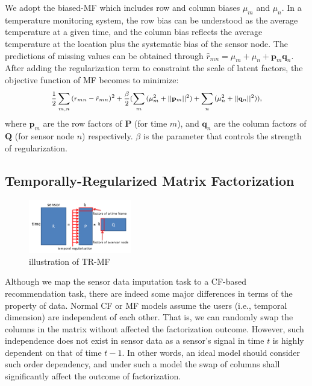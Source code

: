 We adopt the biased-MF which includes row and column biases $\mu_m$ and $\mu_n$. 
In a temperature monitoring system, the row bias can be understood as the average temperature at a given time, and the column bias reflects the average temperature at the location plus the systematic bias of the sensor node.
The predictions of missing values can be obtained through $\hat{r}_{mn} = \mu_m + \mu_n + \mathbf{p}_m \mathbf{q}_n$.
After adding the regularization term to constraint the scale of latent factors, the objective function of MF becomes to minimize:
\begin{equation*}\small \begin{aligned}
\frac{1}{2}\sum_{m,n}{(r_{mn} - \hat{r}_{mn})}^2
+ \frac{\beta}{2}(\sum_m{(\mu_m^2 + ||\mathbf{p}_m||^2)} + \sum_n{(\mu_n^2 + ||\mathbf{q}_n||^2)}),
\end{aligned}\end{equation*}
where $\mathbf{p}_m$ are the row factors of $\mathbf{P}$ (for time $m$), and $\mathbf{q}_n$ are the column factors of $\mathbf{Q}$ (for sensor node $n$) respectively.
$\beta$ is the parameter that controls the strength of regularization.

\subsection{Temporally-Regularized Matrix Factorization}
\begin{figure}[htbp]
	\centering
	\includegraphics[width=0.4\textwidth]{TRMF_illustration.png}
	\caption{illustration of TR-MF}
\end{figure}
Although we map the sensor data imputation task to a CF-based recommendation task, there are indeed some major differences in terms of the property of data.
Normal CF or MF models assume the users (i.e., temporal dimension) are independent of each other. That is, we can randomly swap the columns in the matrix without affected the factorization outcome. However, such independence does not exist in sensor data as a 
sensor's signal in time $t$ is highly dependent on that of time $t-1$. In other words, an ideal model should consider such order dependency, and under such a model the swap of columns shall significantly affect the outcome of factorization.


